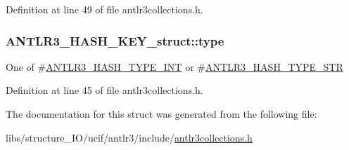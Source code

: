 Definition at line 49 of file antlr3collections.\-h.

\hypertarget{struct_a_n_t_l_r3___h_a_s_h___k_e_y__struct_a301b97e69981f8c366b403d90dd67031}{
\subsubsection[{type}]{ A\-N\-T\-L\-R3\-\_\-\-H\-A\-S\-H\-\_\-\-K\-E\-Y\-\_\-struct\-::type}}\label{struct_a_n_t_l_r3___h_a_s_h___k_e_y__struct_a301b97e69981f8c366b403d90dd67031}
One of \#\hyperlink{antlr3collections_8h_a2dd62def2462cc1572472a4f156081fe}{A\-N\-T\-L\-R3\-\_\-\-H\-A\-S\-H\-\_\-\-T\-Y\-P\-E\-\_\-\-I\-N\-T} or \#\hyperlink{antlr3collections_8h_a71ad9ddc64f0cf36d37698d628b524a8}{A\-N\-T\-L\-R3\-\_\-\-H\-A\-S\-H\-\_\-\-T\-Y\-P\-E\-\_\-\-S\-T\-R} 

Definition at line 45 of file antlr3collections.\-h.



The documentation for this struct was generated from the following file\-:\begin{DoxyCompactItemize}
\item 
libs/structure\-\_\-\-I\-O/ucif/antlr3/include/\hyperlink{antlr3collections_8h}{antlr3collections.\-h}\end{DoxyCompactItemize}
